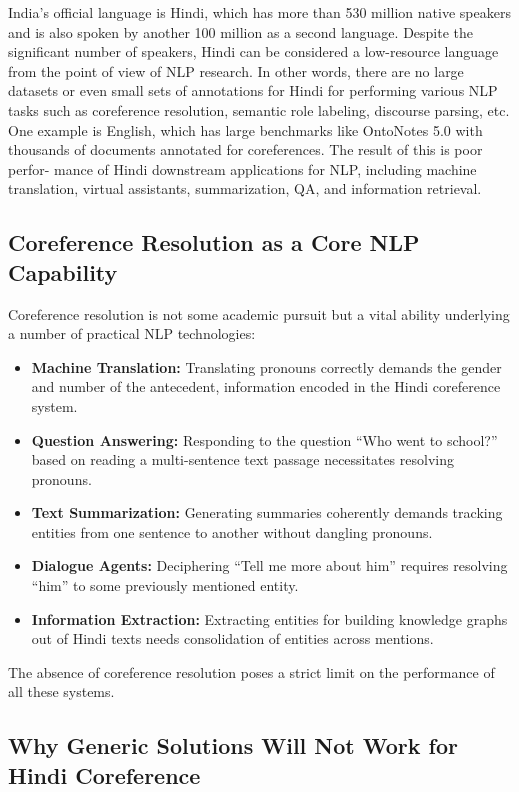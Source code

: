 \documentclass[12pt,a4paper]{report}
\begin{document}
India’s official language is Hindi, which has more than 530 million native speakers and
is also spoken by another 100 million as a second language. Despite the significant number of
speakers, Hindi can be considered a low-resource language from the point of view of NLP
research. In other words, there are no large datasets or even small sets of annotations for Hindi
for performing various NLP tasks such as coreference resolution, semantic role labeling,
discourse parsing, etc. One example is English, which has large benchmarks like OntoNotes
5.0 with thousands of documents annotated for coreferences. The result of this is poor perfor-
mance of Hindi downstream applications for NLP, including machine translation, virtual
assistants, summarization, QA, and information retrieval.

\subsection{Coreference Resolution as a Core NLP Capability}

Coreference resolution is not some academic pursuit but a vital ability underlying a number of practical NLP technologies:

\begin{itemize}
    \item \textbf{Machine Translation:} Translating pronouns correctly demands the gender and number of the antecedent, information encoded in the Hindi coreference system.
    \item \textbf{Question Answering:} Responding to the question “Who went to school?” based on reading a multi-sentence text passage necessitates resolving pronouns.
    \item \textbf{Text Summarization:}  Generating summaries coherently demands tracking entities from one sentence to another without dangling pronouns.
    \item \textbf{Dialogue Agents: } Deciphering “Tell me more about him” requires resolving “him” to some previously mentioned entity.
    \item \textbf{ Information Extraction: }Extracting entities for building knowledge graphs out of
Hindi texts needs consolidation of entities across mentions.
\end{itemize}

The absence of coreference resolution poses a strict limit on the performance of all
these systems.

\subsection{Why Generic Solutions Will Not Work for Hindi Coreference
}
\end{document}
